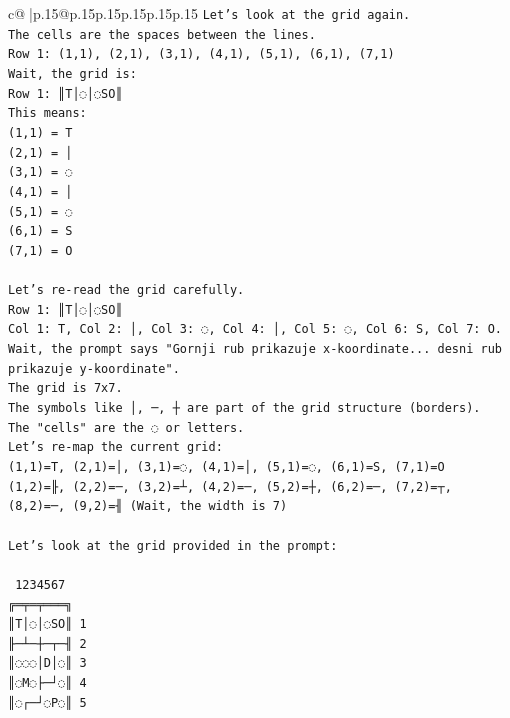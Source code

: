 \documentclass{article}
\begin{document}
{\begin{supertabular}{c@{$\;$}|p{.15\linewidth}@{}p{.15\linewidth}p{.15\linewidth}p{.15\linewidth}p{.15\linewidth}p{.15\linewidth}}
{{{\texttt{Let's look at the grid again.} \\
\texttt{The cells are the spaces between the lines.} \\
\texttt{Row 1: (1,1), (2,1), (3,1), (4,1), (5,1), (6,1), (7,1)} \\
\texttt{Wait, the grid is:} \\
\texttt{Row 1: ║T│◌│◌SO║} \\
\texttt{This means:} \\
\texttt{(1,1) = T} \\
\texttt{(2,1) = │} \\
\texttt{(3,1) = ◌} \\
\texttt{(4,1) = │} \\
\texttt{(5,1) = ◌} \\
\texttt{(6,1) = S} \\
\texttt{(7,1) = O} \\
\\ 
\texttt{Let's re{-}read the grid carefully.} \\
\texttt{Row 1: ║T│◌│◌SO║} \\
\texttt{Col 1: T, Col 2: │, Col 3: ◌, Col 4: │, Col 5: ◌, Col 6: S, Col 7: O.} \\
\texttt{Wait, the prompt says "Gornji rub prikazuje x{-}koordinate... desni rub prikazuje y{-}koordinate".} \\
\texttt{The grid is 7x7.} \\
\texttt{The symbols like │, ─, ┼ are part of the grid structure (borders).} \\
\texttt{The "cells" are the ◌ or letters.} \\
\texttt{Let's re{-}map the current grid:} \\
\texttt{(1,1)=T, (2,1)=│, (3,1)=◌, (4,1)=│, (5,1)=◌, (6,1)=S, (7,1)=O} \\
\texttt{(1,2)=╟, (2,2)=─, (3,2)=┴, (4,2)=─, (5,2)=┼, (6,2)=─, (7,2)=┬, (8,2)=─, (9,2)=╢ (Wait, the width is 7)} \\
\\ 
\texttt{Let's look at the grid provided in the prompt:} \\
\\ 
\texttt{ 1234567} \\
\texttt{╔═╤═╤═══╗} \\
\texttt{║T│◌│◌SO║ 1} \\
\texttt{╟─┴─┼─┬─╢ 2} \\
\texttt{║◌◌◌│D│◌║ 3} \\
\texttt{║◌M◌├─┘◌║ 4} \\
\texttt{║◌┌─┘◌P◌║ 5} \\
}}}
\end{supertabular}}
\end{document}

